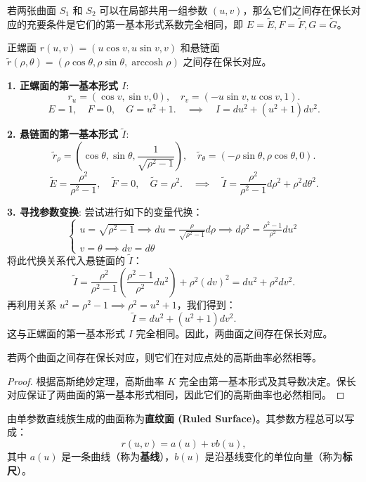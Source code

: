 \documentclass[lang=cn,10pt,thmcnt=section]{elegantbook}
\begin{document}
\begin{corollary}
    若两张曲面 $S_1$ 和 $S_2$ 可以在局部共用一组参数 $(u,v)$，那么它们之间存在保长对应的充要条件是它们的第一基本形式系数完全相同，即 $E = \widetilde{E}, F = \widetilde{F}, G = \widetilde{G}$。
\end{corollary}

\begin{example}[正螺面与悬链面]
    正螺面 $r(u,v) = (u \cos v, u \sin v, v)$ 和悬链面 $\tilde{r}(\rho, \theta) = (\rho \cos \theta, \rho \sin \theta, \operatorname{arccosh} \rho)$ 之间存在保长对应。
    
    \textbf{1. 正螺面的第一基本形式 $I$}:
    \[ r_u = (\cos v, \sin v, 0), \quad r_v = (-u \sin v, u \cos v, 1). \]
    \[ E = 1, \quad F = 0, \quad G = u^2 + 1. \quad \implies \quad I = du^2 + (u^2 + 1) dv^2. \]
    
    \textbf{2. 悬链面的第一基本形式 $\widetilde{I}$}:
    \[ \tilde{r}_\rho = \left(\cos \theta, \sin \theta, \frac{1}{\sqrt{\rho^2 - 1}}\right), \quad \tilde{r}_\theta = (-\rho \sin \theta, \rho \cos \theta, 0). \]
    \[ \widetilde{E} = \frac{\rho^2}{\rho^2 - 1}, \quad \widetilde{F} = 0, \quad \widetilde{G} = \rho^2. \quad \implies \quad \widetilde{I} = \frac{\rho^2}{\rho^2 - 1} d\rho^2 + \rho^2 d\theta^2. \]
    
    \textbf{3. 寻找参数变换}: 尝试进行如下的变量代换：
    \[
    \begin{cases}
    u = \sqrt{\rho^2 - 1} \implies du = \frac{\rho}{\sqrt{\rho^2 - 1}} d\rho \implies d\rho^2 = \frac{\rho^2-1}{\rho^2}du^2 \\
    v = \theta \implies dv = d\theta
    \end{cases}
    \]
    将此代换关系代入悬链面的 $\widetilde{I}$：
    \[
    \widetilde{I} = \frac{\rho^2}{\rho^2 - 1} \left(\frac{\rho^2 - 1}{\rho^2}du^2\right) + \rho^2 (dv)^2 = du^2 + \rho^2 dv^2.
    \]
    再利用关系 $u^2 = \rho^2-1 \implies \rho^2 = u^2+1$，我们得到：
    \[
    \widetilde{I} = du^2 + (u^2+1)dv^2.
    \]
    这与正螺面的第一基本形式 $I$ 完全相同。因此，两曲面之间存在保长对应。
\end{example}

\begin{proposition}
    若两个曲面之间存在保长对应，则它们在对应点处的高斯曲率必然相等。
\end{proposition}
\begin{proof}
    根据高斯绝妙定理，高斯曲率 $K$ 完全由第一基本形式及其导数决定。保长对应保证了两曲面的第一基本形式相同，因此它们的高斯曲率也必然相同。
\end{proof}
\begin{definition}[直纹面]
    由单参数直线族生成的曲面称为\textbf{直纹面 (Ruled Surface)}。其参数方程总可以写成：
    \[
    r(u,v) = a(u) + v b(u),
    \]
    其中 $a(u)$ 是一条曲线（称为\textbf{基线}），$b(u)$ 是沿基线变化的单位向量（称为\textbf{标尺}）。
\end{definition}
\end{document}
